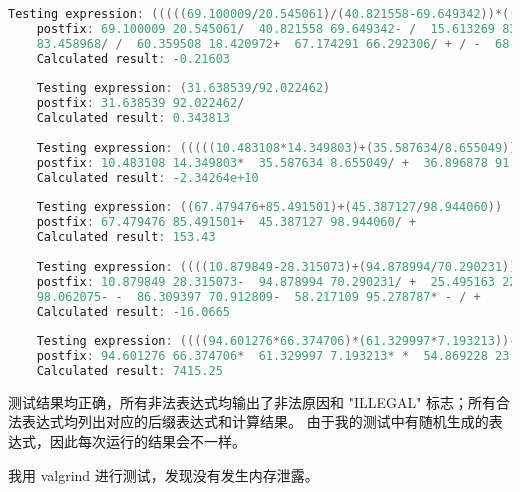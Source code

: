 \documentclass[UTF8]{ctexart}
\begin{document}
\begin{lstlisting}[language=c++, breaklines=true, frame=shadowbox, rulesepcolor=\color{red!20!green!20!blue!20}]
    Testing expression: (((((69.100009/20.545061)/(40.821558-69.649342))*((15.613269+83.532212)/(20.969268-24.549089)))-(((82.747887*91.503647)/(74.440748/83.458968))/((60.359508+18.420972)+(67.174291/66.292306))))/((((68.111209*5.441450)/(14.252144-62.312693))/((97.262490+43.354595)+(77.932066/18.796350)))+(((64.949492/67.479476)*(78.194525+42.228462))*((81.014435-65.108188)/(15.796381-11.935789)))))     
    postfix: 69.100009 20.545061/  40.821558 69.649342- /  15.613269 83.532212+  20.969268 24.549089- / *  82.747887 91.503647*  74.440748 
    83.458968/ /  60.359508 18.420972+  67.174291 66.292306/ + / -  68.111209 5.441450*  14.252144 62.312693- /  97.262490 43.354595+  77.932066 18.796350/ + /  64.949492 67.479476/  78.194525 42.228462+ *  81.014435 65.108188-  15.796381 11.935789- / * + /
    Calculated result: -0.21603
    
    Testing expression: (31.638539/92.022462)
    postfix: 31.638539 92.022462/
    Calculated result: 0.343813
    
    Testing expression: (((((10.483108*14.349803)+(35.587634/8.655049))/((36.896878+91.918699)-(69.533372+9.588916)))*(((63.902707+71.578112)+(87.267678/17.389447))/((64.857936+76.842555)*(44.962920/35.605945))))+((((42.326121*65.031892)+(44.218268+25.611133))*((13.626514*3.433332)*(73.845637*89.034700)))*(((8.893094*57.985168)/(64.171270*62.657552))+((81.606494/94.436476)-(53.837703-25.861385)))))        
    postfix: 10.483108 14.349803*  35.587634 8.655049/ +  36.896878 91.918699+  69.533372 9.588916+ - /  63.902707 71.578112+  87.267678 17.389447/ +  64.857936 76.842555+  44.962920 35.605945/ * / *  42.326121 65.031892*  44.218268 25.611133+ +  13.626514 3.433332*  73.845637 89.034700* * *  8.893094 57.985168*  64.171270 62.657552* /  81.606494 94.436476/  53.837703 25.861385- - + * +
    Calculated result: -2.34264e+10
    
    Testing expression: ((67.479476+85.491501)+(45.387127/98.944060))
    postfix: 67.479476 85.491501+  45.387127 98.944060/ +
    Calculated result: 153.43
    
    Testing expression: ((((10.879849-28.315073)+(94.878994/70.290231))+((25.495163-22.128971)/(13.440352+60.817286)))+(((92.974639-16.464736)-(28.382214-98.062075))/((86.309397-70.912809)-(58.217109*95.278787))))
    postfix: 10.879849 28.315073-  94.878994 70.290231/ +  25.495163 22.128971-  13.440352 60.817286+ / +  92.974639 16.464736-  28.382214 
    98.062075- -  86.309397 70.912809-  58.217109 95.278787* - / +
    Calculated result: -16.0665
    
    Testing expression: ((((94.601276*66.374706)*(61.329997*7.193213))-((54.869228/23.648793)/(76.149785-76.354259)))/(((42.332224+11.578722)/(4.232917*10.422071))-((54.554888+14.703818)-(11.316263*39.024018))))
    postfix: 94.601276 66.374706*  61.329997 7.193213* *  54.869228 23.648793/  76.149785 76.354259- / -  42.332224 11.578722+  4.232917 10.422071* /  54.554888 14.703818+  11.316263 39.024018* - - /
    Calculated result: 7415.25
\end{lstlisting}

测试结果均正确，所有非法表达式均输出了非法原因和 "ILLEGAL" 标志；所有合法表达式均列出对应的后缀表达式和计算结果。
由于我的测试中有随机生成的表达式，因此每次运行的结果会不一样。

我用 valgrind 进行测试，发现没有发生内存泄露。
\end{document}
